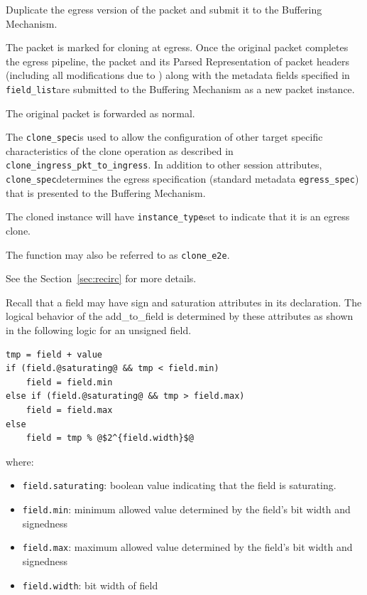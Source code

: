 \documentclass[12pt]{article}
\begin{document}
{ %
Duplicate the egress version of the packet and submit it to the Buffering 
Mechanism.
}
{ %
}
{ %
The packet is marked for cloning at egress. Once the original packet completes 
the egress pipeline, the packet and its Parsed Representation of packet headers 
(including all modifications due to \matchaction) along with the metadata 
fields specified in \texttt{field_list}are submitted to the Buffering Mechanism as 
a new packet instance. 

The original packet is forwarded as normal.

The \texttt{clone_spec}is used to allow the configuration of other target specific 
characteristics of the clone operation as described in \texttt{clone_ingress_pkt_to_ingress}. 
In addition to other session attributes, \texttt{clone_spec}determines the egress 
specification (standard metadata \texttt{egress_spec}) that is presented to the 
Buffering Mechanism.

The cloned instance will have \texttt{instance_type}set to indicate that it is an 
egress clone. 

The function may also be referred to as \texttt{clone_e2e}.

See the Section~\ref{sec:recirc} for more details.
}



Recall that a field may have sign and saturation attributes in its declaration. 
The logical behavior of the add_to_field is determined by these attributes 
as shown in the following logic for an unsigned field.

\begin{lstlisting}[keywords={},frame=single,escapechar=\@]
tmp = field + value
if (field.@saturating@ && tmp < field.min)
    field = field.min
else if (field.@saturating@ && tmp > field.max)
    field = field.max
else
    field = tmp % @$2^{field.width}$@
\end{lstlisting}


where:

\begin{itemize}
\item
\texttt{field.saturating}: boolean value indicating that the field is saturating.
\item
\texttt{field.min}: minimum allowed value determined by the field's bit width and 
signedness
\item
\texttt{field.max}: maximum allowed value determined by the field's bit width and 
signedness
\item
\texttt{field.width}: bit width of field
\end{itemize}
\end{document}

